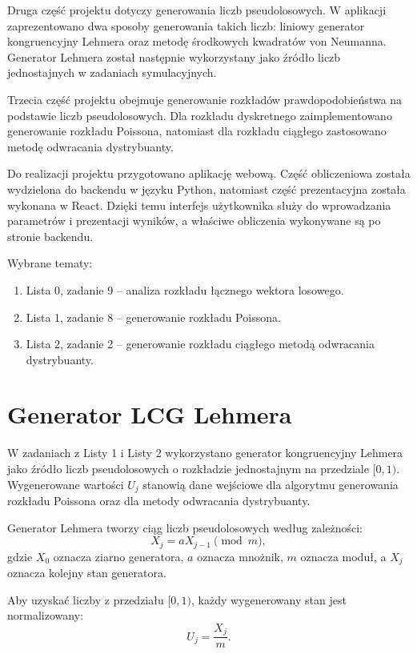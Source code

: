 \documentclass[12pt,a4paper]{article}
\begin{document}
Druga część projektu dotyczy generowania liczb pseudolosowych. W aplikacji zaprezentowano dwa sposoby generowania takich liczb: liniowy generator kongruencyjny Lehmera oraz metodę środkowych kwadratów von Neumanna. Generator Lehmera został następnie wykorzystany jako źródło liczb jednostajnych w zadaniach symulacyjnych.

Trzecia część projektu obejmuje generowanie rozkładów prawdopodobieństwa na podstawie liczb pseudolosowych. Dla rozkładu dyskretnego zaimplementowano generowanie rozkładu Poissona, natomiast dla rozkładu ciągłego zastosowano metodę odwracania dystrybuanty.

Do realizacji projektu przygotowano aplikację webową. Część obliczeniowa została wydzielona do backendu w języku Python, natomiast część prezentacyjna została wykonana w React. Dzięki temu interfejs użytkownika służy do wprowadzania parametrów i prezentacji wyników, a właściwe obliczenia wykonywane są po stronie backendu.

Wybrane tematy:
\begin{enumerate}
  \item Lista 0, zadanie 9 -- analiza rozkładu łącznego wektora losowego.
  \item Lista 1, zadanie 8 -- generowanie rozkładu Poissona.
  \item Lista 2, zadanie 2 -- generowanie rozkładu ciągłego metodą odwracania dystrybuanty.
\end{enumerate}

\section{Generator LCG Lehmera}

W zadaniach z Listy 1 i Listy 2 wykorzystano generator kongruencyjny Lehmera jako źródło liczb pseudolosowych o rozkładzie jednostajnym na przedziale $[0,1)$. Wygenerowane wartości $U_j$ stanowią dane wejściowe dla algorytmu generowania rozkładu Poissona oraz dla metody odwracania dystrybuanty.

Generator Lehmera tworzy ciąg liczb pseudolosowych według zależności:
\begin{equation}
  X_j = aX_{j-1} \pmod m,
\end{equation}
gdzie $X_0$ oznacza ziarno generatora, $a$ oznacza mnożnik, $m$ oznacza moduł, a $X_j$ oznacza kolejny stan generatora.

Aby uzyskać liczby z przedziału $[0,1)$, każdy wygenerowany stan jest normalizowany:
\begin{equation}
  U_j = \frac{X_j}{m}.
\end{equation}
\end{document}
